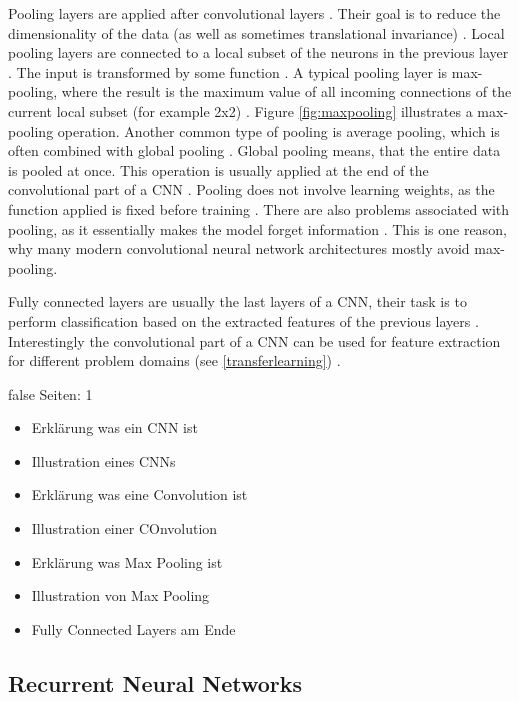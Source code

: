 \documentclass[draft,final,oneside]{vutinfth} %
\begin{document}
Pooling layers are applied after convolutional layers \cite{alexnet}. Their goal is to reduce the dimensionality of the data (as well as sometimes translational invariance) \cite{dlvc}. Local pooling layers are connected to a local subset of the neurons in the previous layer \cite{Goodfellow-et-al-2016}. The input is transformed by some function \cite{dlvc}. A typical pooling layer is max-pooling, where the result is the maximum value of all incoming connections of the current local subset (for example 2x2) \cite{alexnet}. Figure \ref{fig:maxpooling} illustrates a max-pooling operation. Another common type of pooling is average pooling, which is often combined with global pooling \cite{globalaveragepooling}. Global pooling means, that the entire data is pooled at once. This operation is usually applied at the end of the convolutional part of a CNN \cite{globalaveragepooling}. Pooling does not involve learning weights, as the function applied is fixed before training \cite{Goodfellow-et-al-2016}. There are also problems associated with pooling, as it essentially makes the model forget information \cite{resnet}. This is one reason, why many modern convolutional neural network architectures mostly avoid max-pooling. \cite{resnet}

Fully connected layers are usually the last layers of a CNN, their task is to perform classification based on the extracted features of the previous layers \cite{alexnet}. Interestingly the convolutional part of a CNN can be used for feature extraction for different problem domains (see \ref{transferlearning}) \cite{deeplearninginneuralnetworks}.

\if false
Seiten: 1
\begin{itemize}

\item Erklärung was ein CNN ist
\item Illustration eines CNNs
\item Erklärung was eine Convolution ist
\item Illustration einer COnvolution
\item Erklärung was Max Pooling ist
\item Illustration von Max Pooling
\item Fully Connected Layers am Ende


\end{itemize}
\fi

\subsection{Recurrent Neural Networks} \label{lstmbackground}
\end{document}
